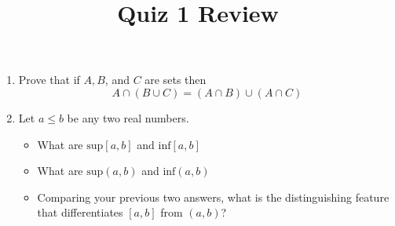 \documentclass[10pt,a4paper,oneside]{book}
\title{Quiz 1 Review}
\author{}
\date{}
\begin{document}
\maketitle

\begin{enumerate}
    \item Prove that if $A,B$, and $C$ are sets then 
    \[ A\cap (B\cup C) = (A\cap B)\cup (A\cap C)\]

    \item Let $a\leq b$ be any two real numbers.
    \begin{itemize}
        \item What are $\text{sup}[a,b]$ and $\text{inf}[a,b]$
        \item What are $\text{sup}(a,b)$ and $\text{inf}(a,b)$
        \item Comparing your previous two answers, what is the distinguishing feature that differentiates $[a,b]$ from $(a,b)$?
    \end{itemize}
 
\end{enumerate}
\end{document}
